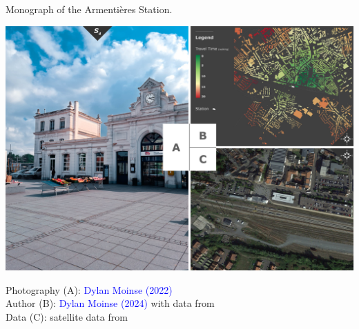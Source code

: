 \begin{refsegment}
    \begin{carte}[h!]\vspace*{4pt}
    \caption{Monograph of the Armentières Station.}
    \label{fig-chap3:monographie-armentieres}
    \centerline{\includegraphics[height=.35\pageheight]{src/Figures/Chap-3/EN_Gare_Armentieres.jpg}}
    \vspace{5pt}
    \begin{flushright}\scriptsize{
    Photography (A): \textcolor{blue}{Dylan Moinse (2022)}
    \\
    Author (B): \textcolor{blue}{Dylan Moinse (2024)} with data from \textcolor{blue}{\textcite{openstreetmap_openstreetmap_2023}}
    \\
    Data (C): satellite data from \textcolor{blue}{\textcite{google_earth_google_2023}}
    }\end{flushright}
    \end{carte}


\end{refsegment}
